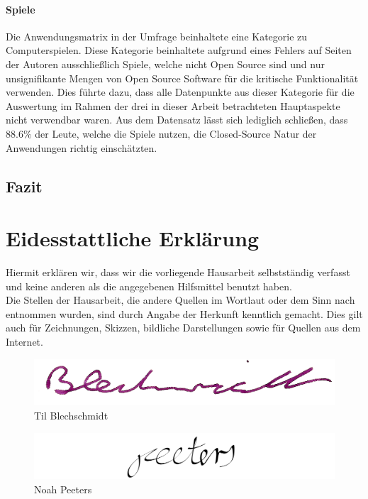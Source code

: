 \documentclass[a4paper]{article}
\begin{document}
            \paragraph{Spiele}
                Die Anwendungsmatrix in der Umfrage beinhaltete eine Kategorie zu Computerspielen. Diese Kategorie beinhaltete aufgrund eines Fehlers auf Seiten der Autoren ausschließlich Spiele, welche nicht Open Source sind und nur unsignifikante Mengen von Open Source Software für die kritische Funktionalität verwenden. Dies führte dazu, dass alle Datenpunkte aus dieser Kategorie für die Auswertung im Rahmen der drei in dieser Arbeit betrachteten Hauptaspekte nicht verwendbar waren. Aus dem Datensatz lässt sich lediglich schließen, dass $88.6\%$ der Leute, welche die Spiele nutzen, die Closed-Source Natur der Anwendungen richtig einschätzten.
            
        \subsection{Fazit}
        
    
    \clearpage
    \section{Eidesstattliche Erklärung}
        Hiermit erklären wir, dass wir die vorliegende Hausarbeit selbstständig verfasst und keine anderen als die angegebenen Hilfsmittel benutzt haben.\\
        Die Stellen der Hausarbeit, die andere Quellen im Wortlaut oder dem Sinn nach entnommen wurden, sind durch Angabe der Herkunft kenntlich gemacht. Dies gilt auch für Zeichnungen, Skizzen, bildliche Darstellungen sowie für Quellen aus dem Internet.
        
        
        \begin{figure}[H]
            \centering
            \begin{minipage}{.5\textwidth}
                \centering
                \includegraphics[width=\textwidth]{assets/signature_tilb.png}
                Til Blechschmidt
            \end{minipage}%
            \begin{minipage}{.5\textwidth}
                \centering
                \includegraphics[width=\textwidth]{assets/signature_noahp.png}
                Noah Peeters
            \end{minipage}
        \end{figure}
        \clearpage
    
\end{document}
